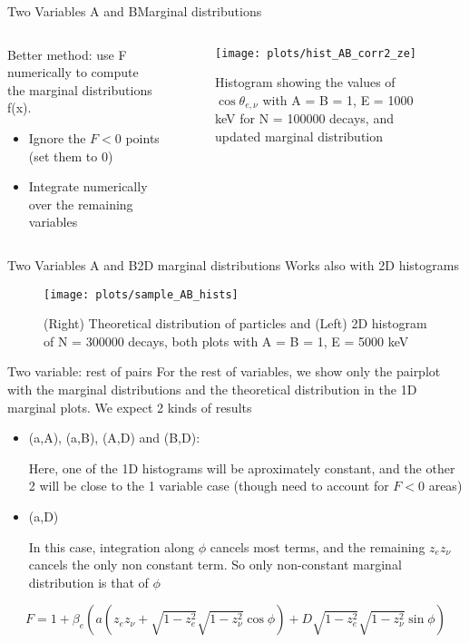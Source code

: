 \documentclass{beamer}
\begin{document}
\begin{frame}{Two Variables A and B}{Marginal distributions}
	\begin{columns}
		\begin{column}{0.5\textwidth}
			Better method: use F numerically to compute the marginal distributions f(x).
			\begin{itemize}
				\item Ignore the $F < 0$ points (set them to 0)
				\item Integrate numerically over the remaining variables 
			\end{itemize} 
			
		\end{column}
		\begin{column}{0.5\textwidth}
			\begin{figure}
				\centering
				\texttt{[image: plots/hist\_AB\_corr2\_ze]}
				\caption{Histogram showing the values of $\cos \theta_{e,\nu}$ with A = B = 1, E = 1000 keV for N = 100000 decays, and updated marginal distribution}
			\end{figure}
		\end{column}
	\end{columns}
\end{frame}


\begin{frame}{Two Variables A and B}{2D marginal distributions}
	Works also with 2D histograms
	\begin{figure}
		\centering
		\texttt{[image: plots/sample\_AB\_hists]}
		\caption{(Right) Theoretical distribution of particles and (Left) 2D histogram of N = 300000 decays, both plots with A = B = 1, E = 5000 keV}	
	\end{figure}
\end{frame}

\begin{frame}{Two variable: rest of pairs}
	For the rest of variables, we show only the pairplot with the marginal distributions and the theoretical distribution in the 1D marginal plots. We expect 2 kinds of results
	
	\begin{itemize}
		\item (a,A), (a,B), (A,D) and (B,D):
		
		Here, one of the 1D histograms will be aproximately constant, and the other 2 will be close to the 1 variable case (though need to account for $F < 0$ areas)
		
		\item (a,D)
		
		In this case, integration along $\phi$ cancels most terms, and the remaining $z_ez_\nu$ cancels the only non constant term. So only non-constant marginal distribution is that of $\phi$

	\end{itemize}
	
	$$F = 1 + \beta_e(a (z_ez_\nu + \sqrt{1-z^2_e}\sqrt{1-z^2_\nu}\cos \phi) + D\sqrt{1-z^2_e}\sqrt{1-z^2_\nu}\sin \phi)$$
	
\end{frame}
\end{document}
